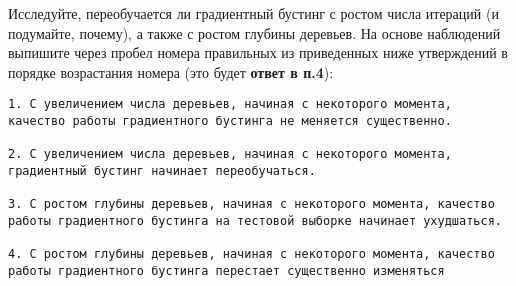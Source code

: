 \documentclass[11pt]{article}
\begin{document}
Исследуйте, переобучается ли градиентный бустинг с ростом числа итераций
(и подумайте, почему), а также с ростом глубины деревьев. На основе
наблюдений выпишите через пробел номера правильных из приведенных ниже
утверждений в порядке возрастания номера (это будет \textbf{ответ в
п.4}):

\begin{verbatim}
1. С увеличением числа деревьев, начиная с некоторого момента, качество работы градиентного бустинга не меняется существенно.

2. С увеличением числа деревьев, начиная с некоторого момента, градиентный бустинг начинает переобучаться.

3. С ростом глубины деревьев, начиная с некоторого момента, качество работы градиентного бустинга на тестовой выборке начинает ухудшаться.

4. С ростом глубины деревьев, начиная с некоторого момента, качество работы градиентного бустинга перестает существенно изменяться
\end{verbatim}
\end{document}
